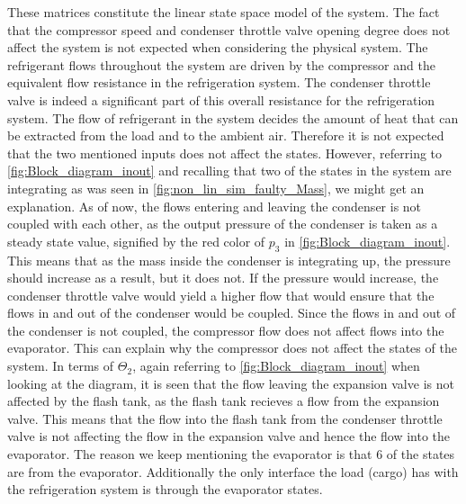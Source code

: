 These matrices constitute the linear state space model of the system. 
The fact that the compressor speed and condenser throttle valve opening degree does not affect the system is not expected when considering the physical system. The refrigerant flows throughout the system are driven by the compressor and the equivalent flow resistance in the refrigeration system. The condenser throttle valve is indeed a significant part of this overall resistance for the refrigeration system. 
The flow of refrigerant in the system decides the amount of heat that can be extracted from the load and to the ambient air. Therefore it is not expected that the two mentioned inputs does not affect the states. However, referring to \cref{fig:Block_diagram_inout} and recalling that two of the states in the system are integrating as was seen in \cref{fig:non_lin_sim_faulty_Mass}, we might get an explanation. As of now, the flows entering and leaving the condenser is not coupled with each other, as the output pressure of the condenser is taken as a steady state value, signified by the red color of $ p_3 $ in \cref{fig:Block_diagram_inout}. This means that as the mass inside the condenser is integrating up, the pressure should increase as a result, but it does not. If the pressure would increase, the condenser throttle valve would yield a higher flow that would ensure that the flows in and out of the condenser would be coupled. 
Since the flows in and out of the condenser is not coupled, the compressor flow does not affect flows into the evaporator. This can explain why the compressor does not affect the states of the system. 
In terms of $ \Theta_2 $, again referring to \cref{fig:Block_diagram_inout} when looking at the diagram, it is seen that the flow leaving the expansion valve is not affected by the flash tank, as the flash tank recieves a flow from the expansion valve. This means that the flow into the flash tank from the condenser throttle valve is not affecting the flow in the expansion valve and hence the flow into the evaporator. 
The reason we keep mentioning the evaporator is that 6 of the states are from the evaporator. Additionally the only interface the load (cargo) has with the refrigeration system is through the evaporator states. 





